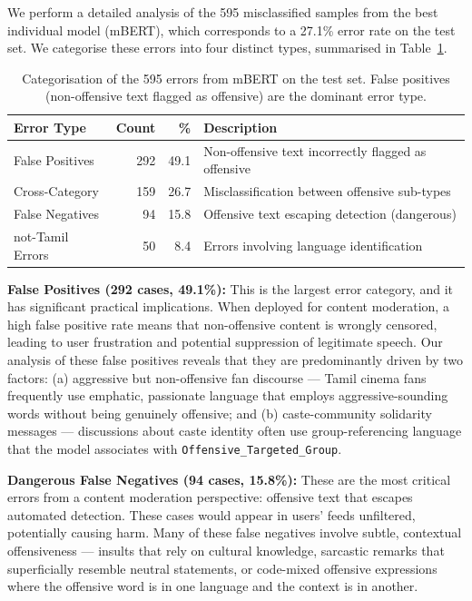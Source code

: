 \documentclass[12pt, a4paper]{article}
\begin{document}
We perform a detailed analysis of the 595 misclassified samples from the best individual model (mBERT), which corresponds to a 27.1\% error rate on the test set. We categorise these errors into four distinct types, summarised in Table~\ref{tab:error_categories}.

\begin{table}[!htbp]
\centering
\caption{Categorisation of the 595 errors from mBERT on the test set. False positives (non-offensive text flagged as offensive) are the dominant error type.}
\label{tab:error_categories}
\begin{tabular}{l r r p{5cm}}
\toprule
\textbf{Error Type} & \textbf{Count} & \textbf{\%} & \textbf{Description} \\
\midrule
False Positives        & 292 & 49.1 & Non-offensive text incorrectly flagged as offensive \\[0.5em]
Cross-Category         & 159 & 26.7 & Misclassification between offensive sub-types \\[0.5em]
False Negatives        & 94  & 15.8 & Offensive text escaping detection (dangerous) \\[0.5em]
not-Tamil Errors       & 50  & 8.4  & Errors involving language identification \\
\bottomrule
\end{tabular}
\end{table}

\vspace{1em}

\textbf{False Positives (292 cases, 49.1\%):} This is the largest error category, and it has significant practical implications. When deployed for content moderation, a high false positive rate means that non-offensive content is wrongly censored, leading to user frustration and potential suppression of legitimate speech. Our analysis of these false positives reveals that they are predominantly driven by two factors: (a) aggressive but non-offensive fan discourse --- Tamil cinema fans frequently use emphatic, passionate language that employs aggressive-sounding words without being genuinely offensive; and (b) caste-community solidarity messages --- discussions about caste identity often use group-referencing language that the model associates with \texttt{Offensive\_Targeted\_Group}.

\textbf{Dangerous False Negatives (94 cases, 15.8\%):} These are the most critical errors from a content moderation perspective: offensive text that escapes automated detection. These cases would appear in users' feeds unfiltered, potentially causing harm. Many of these false negatives involve subtle, contextual offensiveness --- insults that rely on cultural knowledge, sarcastic remarks that superficially resemble neutral statements, or code-mixed offensive expressions where the offensive word is in one language and the context is in another.
\end{document}
